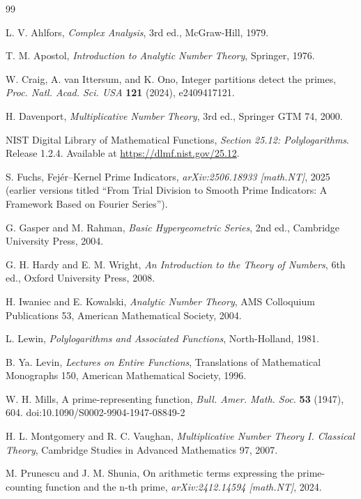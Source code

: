 \begin{thebibliography}{99}

L. V. Ahlfors, \emph{Complex Analysis}, 3rd ed., McGraw-Hill, 1979.

T. M. Apostol, \emph{Introduction to Analytic Number Theory}, Springer, 1976.

W. Craig, A. van Ittersum, and K. Ono, Integer partitions detect the primes,
\emph{Proc. Natl. Acad. Sci. USA} \textbf{121} (2024), e2409417121.

H. Davenport, \emph{Multiplicative Number Theory}, 3rd ed., Springer GTM 74, 2000.

NIST Digital Library of Mathematical Functions, \emph{Section 25.12: Polylogarithms}. Release 1.2.4. Available at \url{https://dlmf.nist.gov/25.12}.

S. Fuchs, Fej\'er--Kernel Prime Indicators, \emph{arXiv:2506.18933 [math.NT]}, 2025 (earlier versions titled ``From Trial Division to Smooth Prime Indicators: A Framework Based on Fourier Series'').

G. Gasper and M. Rahman, \emph{Basic Hypergeometric Series}, 2nd ed., Cambridge University Press, 2004.

G. H. Hardy and E. M. Wright, \emph{An Introduction to the Theory of Numbers}, 6th ed., Oxford University Press, 2008.

H. Iwaniec and E. Kowalski, \emph{Analytic Number Theory},
AMS Colloquium Publications 53, American Mathematical Society, 2004.

L. Lewin, \emph{Polylogarithms and Associated Functions}, North-Holland, 1981.

B. Ya. Levin, \emph{Lectures on Entire Functions}, Translations of Mathematical Monographs 150, American Mathematical Society, 1996.


W. H. Mills, A prime-representing function,
\emph{Bull. Amer. Math. Soc.} \textbf{53} (1947), 604.
doi:10.1090/S0002-9904-1947-08849-2

H. L. Montgomery and R. C. Vaughan, \emph{Multiplicative Number Theory I. Classical Theory}, Cambridge Studies in Advanced Mathematics 97, 2007.

M. Prunescu and J. M. Shunia, On arithmetic terms expressing the prime-counting function and the n-th prime, \emph{arXiv:2412.14594 [math.NT]}, 2024.


\end{thebibliography}
